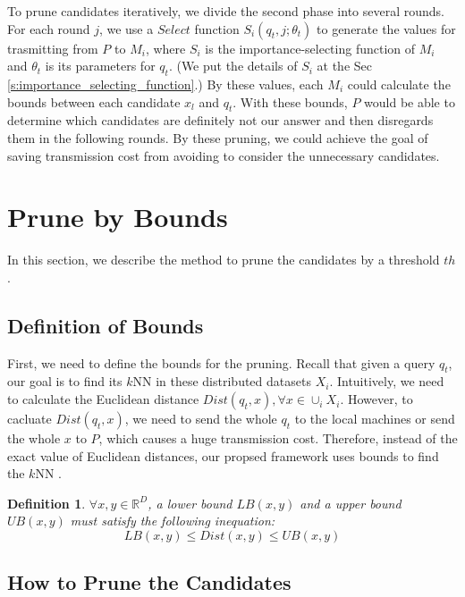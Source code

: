 To prune candidates iteratively, we divide the second phase into several rounds.  For each round $j$, we use a $Select$ function $S_i(q_t,j;\theta_t)$ to generate the values for trasmitting from $P$ to $M_i$, where $S_i$ is the importance-selecting function of $M_i$ and $\theta_t$ is its parameters for $q_t$.  (We put the details of $S_i$ at the Sec \ref{s:importance_selecting_function}.)  By these values, each $M_i$ could calculate the bounds between each candidate $x_l$ and $q_t$.  With these bounds, $P$ would be able to determine which candidates are definitely not our answer and then disregards them in the following rounds.  By these pruning, we could achieve the goal of saving transmission cost from avoiding to consider the unnecessary candidates.

\section{Prune by Bounds}
\label{s:prune}
In this section, we describe the method to prune the candidates by a threshold $th$.

\subsection{Definition of Bounds} %
\label{sub:definition_of_bounds}

First, we need to define the bounds for the pruning.  Recall that given a query $q_t$, our goal is to find its $k$NN in these distributed datasets $X_i$.  Intuitively, we need to calculate the Euclidean distance $Dist(q_t,x), \forall x\in \cup_i X_i$.  However, to cacluate $Dist(q_t,x)$, we need to send the whole $q_t$ to the local machines or send the whole $x$ to $P$, which causes a huge transmission cost.  Therefore, instead of the exact value of Euclidean distances, our propsed framework uses bounds to find the $k$NN .

\newtheorem{Bounds}{\bf Definition}
\begin{Bounds}
$\forall x,y \in \mathbb{R}^D$, a lower bound $LB(x,y)$ and a upper bound $UB(x,y)$ must satisfy the following inequation:
\[
LB(x,y)\leq Dist(x,y) \leq UB(x,y)
\]
\end{Bounds}


\subsection{How to Prune the Candidates} %
\label{sub:prune_the_candidates}

